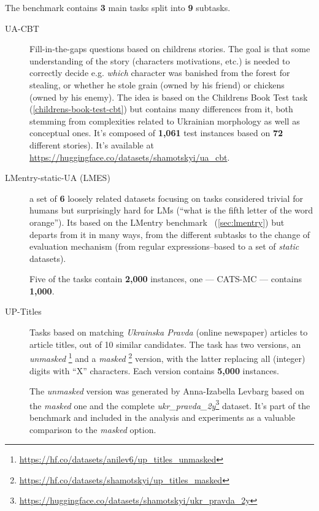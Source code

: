 The benchmark contains \textbf{3} main tasks split into \textbf{9} subtasks.
\begin{description}
\item[UA-CBT] Fill-in-the-gaps questions based on children\textquotesingle s
  stories. 
  The goal is that some understanding of the story
  (characters\textquotesingle{} motivations, etc.) is needed to
  correctly decide e.g. \emph{which} character was banished from the
  forest for stealing, or whether he stole grain (owned by his friend)
  or chickens (owned by his enemy). 
  The idea is based on the
  Children\textquotesingle s Book Test task~\cite{taskCBT} (\autoref{childrens-book-test-cbt}) but contains
  many differences from it, both stemming from complexities related to Ukrainian morphology as well as conceptual ones.
  It's composed of \textbf{1,061} test instances based on \textbf{72} different stories). 
  It's available at 
  \href{https://huggingface.co/datasets/shamotskyi/ua_cbt}{https://huggingface.co/datasets/shamotskyi/ua\_cbt}.
  
\item[LMentry-static-UA (LMES)] a set of \textbf{6} loosely related datasets focusing on tasks considered trivial for humans but surprisingly hard for LMs (``what is the fifth letter of the word
  \textquotesingle orange\textquotesingle'').
  It\textquotesingle s based on the LMentry benchmark~\cite{bm_lmentry} (\autoref{sec:lmentry}) but
  departs from it in many ways, from the different subtasks to the
  change of evaluation mechanism (from regular expressions–based to a set of \textit{static} datasets). 

Five of the tasks contain \textbf{2,000} instances, one — CATS-MC — contains \textbf{1,000}.
  
\item[UP-Titles] Tasks based on matching \textit{Ukrainska Pravda} (online newspaper) articles to article titles, out of 10 similar candidates. The task has two versions, an \textit{unmasked} \footnote{\href{https://hf.co/datasets/anilev6/up_titles_unmasked}{https://hf.co/datasets/anilev6/up\_titles\_unmasked}} 
and a \textit{masked}%
\footnote{\href{https://hf.co/datasets/shamotskyi/up_titles_masked}{https://hf.co/datasets/shamotskyi/up\_titles\_masked}}
version, with the latter replacing all (integer) digits with ``X'' characters. Each version contains \textbf{5,000} instances.

The \textit{unmasked} version was generated by Anna-Izabella Levbarg based on the 
\textit{masked} one and the complete 
\textit{ukr\_pravda\_2y}\footnote{\href{https://huggingface.co/datasets/shamotskyi/ukr_pravda_2y}{https://huggingface.co/datasets/shamotskyi/ukr\_pravda\_2y}} dataset. It's part of the benchmark and included in the analysis and experiments as a valuable comparison to the \textit{masked} option.
\end{description}
